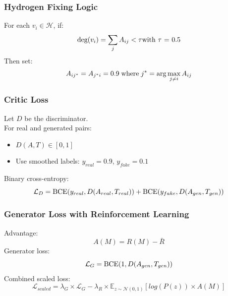\documentclass[conference]{IEEEtran}
\begin{document}
\subsubsection{Hydrogen Fixing Logic}
\textnormal{For each $v_i \in \mathcal{H}$, if:}
\begin{equation}
    \textnormal{deg}(v_i) = \sum_j{A_{ij} < \tau} \textnormal{with $\tau$ = 0.5}
    \label{eq:hydrogen_fix_1}
\end{equation}    
\textnormal{Then set:}
\begin{equation}
    A_{ij^*} = A_{j^*i} = 0.9 \; \textnormal{where} \; j^* = \arg\max_{j \ne i} A_{ij}
    \label{eq:hydrogen_fix_2}
\end{equation}

\subsubsection{Critic Loss}
\textnormal{Let $D$ be the discriminator.}
\\
\textnormal{For real and generated pairs:}
\begin{itemize}
    \item $D(A, T) \in [0, 1]$
    \item \textnormal{Use smoothed labels:} $y_{real} = 0.9$, $y_{fake} = 0.1$
\end{itemize}
\textnormal{Binary cross-entropy:}
\begin{equation}
    \mathcal{L}_D = \textnormal{BCE}(y_{real}, D(A_{real}, T_{real})) + \textnormal{BCE}(y_{fake}, D(A_{gen}, T_{gen}))
    \label{eq:loss_D}
\end{equation}

\subsubsection{Generator Loss with Reinforcement Learning}
\textnormal{Advantage:}
\begin{equation}
    A(M) = R(M) - \bar{R}
    \label{eq:advantage}
\end{equation}
\textnormal{Generator loss:}
\begin{equation}
    \mathcal{L}_G = \textnormal{BCE}(1, D(A_{gen}, T_{gen}))
    \label{eq:loss_G}
\end{equation}
\textnormal{Combined scaled loss:}
\begin{equation}
    \mathcal{L}_{scaled} = \lambda_G \times \mathcal{L}_G - \lambda_R \times \mathbb{E}_{z \sim \mathcal{N}(0, 1)}[log(P(z)) \times A(M)]
    \label{eq:scaled_loss}
\end{equation}
\end{document}
